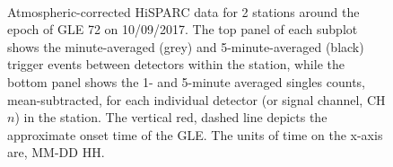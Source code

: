 \begin{figure}[ht!]
	\centering
	 \\
	
	
	\caption{Atmospheric-corrected HiSPARC data for 2 stations around the epoch of GLE 72 on 10/09/2017. The top panel of each subplot shows the minute-averaged (grey) and 5-minute-averaged (black) trigger events between detectors within the station, while the bottom panel shows the 1- and 5-minute averaged singles counts, mean-subtracted, for each individual detector (or signal channel, CH$n$) in the station. The vertical red, dashed line depicts the approximate onset time of the GLE. The units of time on the x-axis are, MM-DD HH.}
	\label{fig:GLE_72_Pcorr}
\end{figure}

